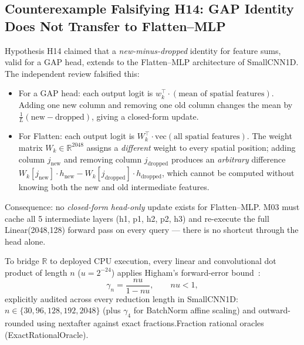 \documentclass[11pt,oneside,a4paper]{report}
\newcommand{\R}{\mathbb{R}}
\newcommand{\code}[1]{{\small\upshape\ttfamily #1}}
\theoremstyle{remark}
\begin{document}
\subsection{Counterexample Falsifying H14: GAP Identity Does Not Transfer to Flatten--MLP}
Hypothesis H14 claimed that a \emph{new-minus-dropped} identity for feature sums, valid for a GAP head, extends to the \code{Flatten--MLP} architecture of \code{SmallCNN1D}. The independent review falsified this:
\begin{itemize}[leftmargin=1.5em]
  \item For a GAP head: each output logit is $w_k^\top \cdot (\text{mean of spatial features})$. Adding one new column and removing one old column changes the mean by $\frac{1}{L}(\text{new} - \text{dropped})$, giving a closed-form update.
  \item For \code{Flatten}: each output logit is $W_k^\top \cdot \text{vec}(\text{all spatial features})$. The weight matrix $W_k \in \R^{2048}$ assigns a \emph{different} weight to every spatial position; adding column $j_{\text{new}}$ and removing column $j_{\text{dropped}}$ produces an \emph{arbitrary} difference $W_k[j_{\text{new}}] \cdot h_{\text{new}} - W_k[j_{\text{dropped}}] \cdot h_{\text{dropped}}$, which cannot be computed without knowing both the new and old intermediate features.
\end{itemize}
Consequence: no \emph{closed-form head-only} update exists for \code{Flatten--MLP}. \code{M03} must cache all 5 intermediate layers (\code{h1, p1, h2, p2, h3}) and re-execute the full \code{Linear(2048,128)} forward pass on every query --- there is no shortcut through the head alone.

To bridge $\R$ to deployed CPU execution, every linear and convolutional dot product of length $n$ ($u = 2^{-24}$) applies Higham's forward-error bound~\cite{higham2002}:
\begin{equation}
\gamma_n = \frac{n u}{1 - n u}, \qquad n u < 1,
\end{equation}
explicitly audited across every reduction length in \code{SmallCNN1D}: $n \in \{30, 96, 128, 192, 2048\}$ (plus $\gamma_4$ for BatchNorm affine scaling) and outward-rounded using \code{nextafter} against exact \code{fractions.Fraction} rational oracles (\code{ExactRationalOracle}).
\end{document}
